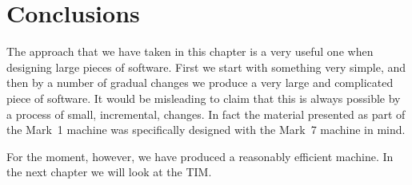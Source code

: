 \section{Conclusions}

The approach that we have taken in this chapter is a very useful one
when designing large pieces of software. First we start with something
very simple, and then by a number of gradual changes we produce a very
large and complicated piece of software.  It would be misleading to
claim that this is always possible by a process of small, incremental,
changes. In fact the material presented as part of the Mark~1 machine
was specifically designed with the Mark~7 machine in mind.

For the moment, however, we have produced a reasonably efficient
machine.  In the next chapter we will look at the TIM.

\theendnotes

